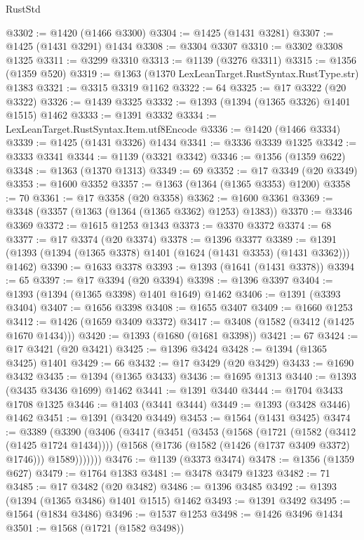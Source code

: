 \begin{lexlean}{RustStd}
\begin{coremodule}
@3302 := @1420 (@1466 @3300)
@3304 := @1425 (@1431 @3281)
@3307 := @1425 (@1431 @3291) @1434
@3308 := @3304 @3307
@3310 := @3302 @3308 @1325
@3311 := @3299 @3310
@3313 := @1139 (@3276 @3311)
@3315 := @1356 (@1359 @520)
@3319 := @1363 (@1370 LexLeanTarget.RustSyntax.RustType.str) @1383
@3321 := @3315 @3319 @1162
@3322 := 64
@3325 := @17 @3322 (@20 @3322)
@3326 := @1439 @3325
@3332 := @1393 (@1394 (@1365 @3326) @1401 @1515) @1462
@3333 := @1391 @3332
@3334 := LexLeanTarget.RustSyntax.Item.utf8Encode
@3336 := @1420 (@1466 @3334)
@3339 := @1425 (@1431 @3326) @1434
@3341 := @3336 @3339 @1325
@3342 := @3333 @3341
@3344 := @1139 (@3321 @3342)
@3346 := @1356 (@1359 @622)
@3348 := @1363 (@1370 @1313)
@3349 := 69
@3352 := @17 @3349 (@20 @3349)
@3353 := @1600 @3352
@3357 := @1363 (@1364 (@1365 @3353) @1200)
@3358 := 70
@3361 := @17 @3358 (@20 @3358)
@3362 := @1600 @3361
@3369 := @3348 (@3357 (@1363 (@1364 (@1365 @3362) @1253) @1383))
@3370 := @3346 @3369
@3372 := @1615 @1253 @1343
@3373 := @3370 @3372
@3374 := 68
@3377 := @17 @3374 (@20 @3374)
@3378 := @1396 @3377
@3389 := @1391 (@1393 (@1394 (@1365 @3378) @1401 (@1624 (@1431 @3353) (@1431 @3362))) @1462)
@3390 := @1633 @3378
@3393 := @1393 (@1641 (@1431 @3378))
@3394 := 65
@3397 := @17 @3394 (@20 @3394)
@3398 := @1396 @3397
@3404 := @1393 (@1394 (@1365 @3398) @1401 @1649) @1462
@3406 := @1391 (@3393 @3404)
@3407 := @1656 @3398
@3408 := @1655 @3407
@3409 := @1660 @1253
@3412 := @1426 (@1659 @3409 @3372)
@3417 := @3408 (@1582 (@3412 (@1425 @1670 @1434)))
@3420 := @1393 (@1680 (@1681 @3398))
@3421 := 67
@3424 := @17 @3421 (@20 @3421)
@3425 := @1396 @3424
@3428 := @1394 (@1365 @3425) @1401
@3429 := 66
@3432 := @17 @3429 (@20 @3429)
@3433 := @1690 @3432
@3435 := @1394 (@1365 @3433)
@3436 := @1695 @1313
@3440 := @1393 (@3435 @3436 @1699) @1462
@3441 := @1391 @3440
@3444 := @1704 @3433 @1708 @1325
@3446 := @1403 (@3441 @3444)
@3449 := @1393 (@3428 @3446) @1462
@3451 := @1391 (@3420 @3449)
@3453 := @1564 (@1431 @3425)
@3474 := @3389
    (@3390
      (@3406
        (@3417
          (@3451
            (@3453
              (@1568
                (@1721 (@1582 (@3412 (@1425 @1724 @1434))))
                (@1568 (@1736 (@1582 (@1426 (@1737 @3409 @3372) @1746))) @1589)))))))
@3476 := @1139 (@3373 @3474)
@3478 := @1356 (@1359 @627)
@3479 := @1764 @1383
@3481 := @3478 @3479 @1323
@3482 := 71
@3485 := @17 @3482 (@20 @3482)
@3486 := @1396 @3485
@3492 := @1393 (@1394 (@1365 @3486) @1401 @1515) @1462
@3493 := @1391 @3492
@3495 := @1564 (@1834 @3486)
@3496 := @1537 @1253
@3498 := @1426 @3496 @1434
@3501 := @1568 (@1721 (@1582 @3498))

\end{coremodule}
\end{lexlean}
